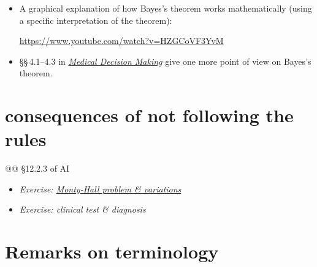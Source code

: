 \documentclass[
  a4paper,
  DIV=11,
  numbers=noendperiod,
  oneside]{scrreprt}
\begin{document}
\begin{tcolorbox}[enhanced jigsaw, colback=white, breakable, coltitle=black, bottomtitle=1mm, title={\faIcon{book} Reading}, leftrule=.75mm, opacitybacktitle=0.6, opacityback=0, colframe=quarto-callout-caution-color-frame, colbacktitle=quarto-callout-caution-color!10!white, rightrule=.15mm, arc=.35mm, titlerule=0mm, toprule=.15mm, left=2mm, toptitle=1mm, bottomrule=.15mm]

\begin{itemize}
\item
  A graphical explanation of how Bayes's theorem works mathematically
  (using a specific interpretation of the theorem):

  \url{https://www.youtube.com/watch?v=HZGCoVF3YvM}
\item
  §§\,4.1--4.3 in
  \href{https://hvl.instructure.com/courses/25074/modules/items/671397}{\emph{Medical
  Decision Making}} give one more point of view on Bayes's theorem.
\end{itemize}

\end{tcolorbox}

\hypertarget{consequences-of-not-following-the-rules}{%
\section{consequences of not following the
rules}\label{consequences-of-not-following-the-rules}}

@@ §12.2.3 of AI

\begin{itemize}
\item
  \emph{Exercise: \href{The_Monty_Hall_problem-exercise.pdf}{Monty-Hall
  problem \& variations}}
\item
  \emph{Exercise: clinical test \& diagnosis}
\end{itemize}

\hypertarget{remarks-on-terminology}{%
\section{Remarks on terminology}\label{remarks-on-terminology}}
\end{document}
